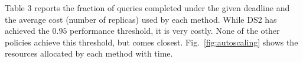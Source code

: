
Table 3 reports the fraction of queries completed under the given deadline and the average
cost (number of replicas) used by each method.
While DS2 has achieved the $0.95$ performance threshold, it is very costly.
None of the other policies achieve this threshold, but \cilantroas{} comes closest.
Fig.~\ref{fig:autoscaling} shows the resources allocated by each method with time.


\insertTableAS
